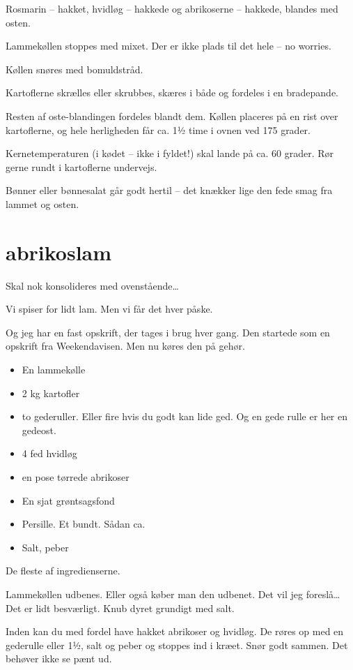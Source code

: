 \documentclass[
]{book}
\providecommand{\tightlist}{%
  \setlength{\itemsep}{0pt}\setlength{\parskip}{0pt}}
\begin{document}
Rosmarin -- hakket, hvidløg -- hakkede og abrikoserne -- hakkede, blandes med osten.

Lammekøllen stoppes med mixet. Der er ikke plads til det hele -- no worries.

Køllen snøres med bomuldstråd.

Kartoflerne skrælles eller skrubbes, skæres i både og fordeles i en bradepande.

Resten af oste-blandingen fordeles blandt dem. Køllen placeres på en rist over kartoflerne, og hele herligheden får ca. 1½ time i ovnen ved 175 grader.

Kernetemperaturen (i kødet -- ikke i fyldet!) skal lande på ca. 60 grader. Rør gerne rundt i kartoflerne undervejs.

Bønner eller bønnesalat går godt hertil -- det knækker lige den fede smag fra lammet og osten.

\section{abrikoslam}\label{abrikoslam}

Skal nok konsolideres med ovenstående\ldots{}

Vi spiser for lidt lam. Men vi får det hver påske.

Og jeg har en fast opskrift, der tages i brug hver gang. Den startede som en opskrift fra Weekendavisen. Men nu køres den på gehør.

\begin{itemize}
\tightlist
\item
  En lammekølle
\item
  2 kg kartofler
\item
  to gederuller. Eller fire hvis du godt kan lide ged. Og en gede rulle er her en gedeost.
\item
  4 fed hvidløg
\item
  en pose tørrede abrikoser
\item
  En sjat grøntsagsfond
\item
  Persille. Et bundt. Sådan ca.
\item
  Salt, peber
\end{itemize}

De fleste af ingredienserne.

Lammekøllen udbenes. Eller også køber man den udbenet. Det vil jeg foreslå\ldots{} Det er lidt besværligt. Knub dyret grundigt med salt.

Inden kan du med fordel have hakket abrikoser og hvidløg. De røres op med en gederulle eller 1½, salt og peber og stoppes ind i kræet. Snør godt sammen. Det behøver ikke se pænt ud.
\end{document}
